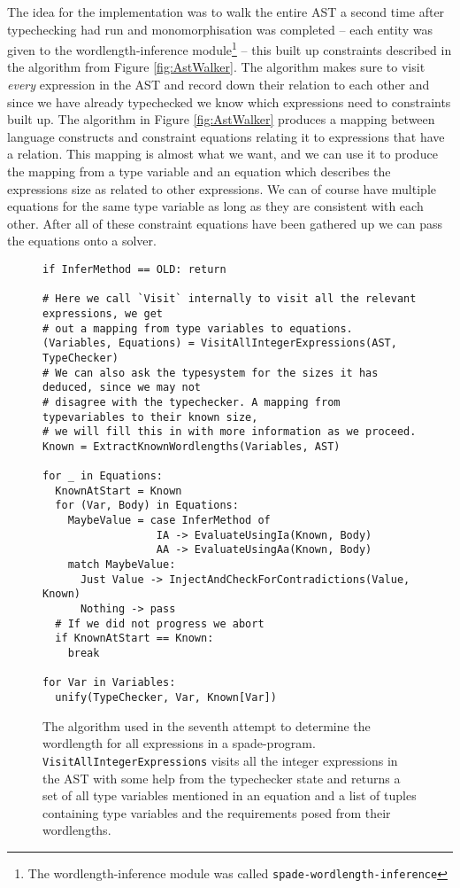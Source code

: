 The idea for the implementation was to walk the entire AST a second time after typechecking had run and monomorphisation was completed -- each entity was given to the wordlength-inference module\cprotect\footnote{The wordlength-inference module was called \verb+spade-wordlength-inference+} -- this built up constraints described in the algorithm from Figure \ref{fig:AstWalker}. The algorithm makes sure to visit \textit{every} expression in the AST and record down their relation to each other and since we have already typechecked we know which expressions need to constraints built up. The algorithm in Figure \ref{fig:AstWalker} produces a mapping between language constructs and constraint equations relating it to expressions that have a relation. This mapping is almost what we want, and we can use it to produce the mapping from a type variable and an equation which describes the expressions size as related to other expressions. We can of course have multiple equations for the same type variable as long as they are consistent with each other. After all of these constraint equations have been gathered up we can pass the equations onto a solver. 

\begin{figure}
\begin{verbatim}
if InferMethod == OLD: return

# Here we call `Visit` internally to visit all the relevant expressions, we get
# out a mapping from type variables to equations.
(Variables, Equations) = VisitAllIntegerExpressions(AST, TypeChecker)
# We can also ask the typesystem for the sizes it has deduced, since we may not
# disagree with the typechecker. A mapping from typevariables to their known size,
# we will fill this in with more information as we proceed.
Known = ExtractKnownWordlengths(Variables, AST)

for _ in Equations:
  KnownAtStart = Known
  for (Var, Body) in Equations:
    MaybeValue = case InferMethod of
                  IA -> EvaluateUsingIa(Known, Body)
                  AA -> EvaluateUsingAa(Known, Body)
    match MaybeValue:
      Just Value -> InjectAndCheckForContradictions(Value, Known)
      Nothing -> pass
  # If we did not progress we abort
  if KnownAtStart == Known:
    break

for Var in Variables:
  unify(TypeChecker, Var, Known[Var])
\end{verbatim}
  \cprotect\caption{The algorithm used in the seventh attempt to determine the wordlength for all expressions in a spade-program. \verb+VisitAllIntegerExpressions+ visits all the integer expressions in the AST with some help from the typechecker state and returns a set of all type variables mentioned in an equation and a list of tuples containing type variables and the requirements posed from their wordlengths.}
\label{fig:WLIAlgo}
\end{figure}

